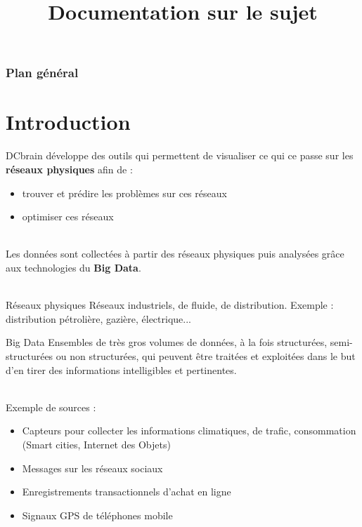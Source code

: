 
\usepackage{../tex/myInfolines}
\title{Documentation sur le sujet}



	\begin{frame}
		\titlepage
	\end{frame}
	
	\begin{frame}
		\frametitle{Plan général}
		\tableofcontents
	\end{frame}
	
	\section{Introduction}
	\begin{frame}
		DCbrain développe des outils qui permettent de visualiser ce qui ce passe sur les \textbf{réseaux physiques} afin de :
		\begin{itemize}
		\item trouver et prédire les problèmes sur ces réseaux
		\item optimiser ces réseaux
		\end{itemize}
		~\\
		\pause
		Les données sont collectées à partir des réseaux physiques puis analysées grâce aux technologies du \textbf{Big Data}.\\~\\
		\pause
		\begin{block}{Réseaux physiques}
		Réseaux industriels, de fluide, de distribution. Exemple : distribution pétrolière, gazière, électrique...
		\end{block}
	\end{frame}
	
	\begin{frame} 
		\begin{block}{Big Data}
		Ensembles de très gros volumes de données, à la fois structurées, semi-structurées ou non structurées, qui peuvent être traitées et exploitées dans le but d’en tirer des informations intelligibles et pertinentes.
		\end{block}
		\pause
		~\\
		Exemple de sources : 
		\begin{itemize}
			\pause\item Capteurs pour collecter les informations climatiques, de trafic, consommation (Smart cities, Internet des Objets)
			\pause\item Messages sur les réseaux sociaux 
			\pause\item Enregistrements transactionnels d’achat en ligne 
			\pause\item Signaux GPS de téléphones mobile
		\end{itemize}
	\end{frame}
	
